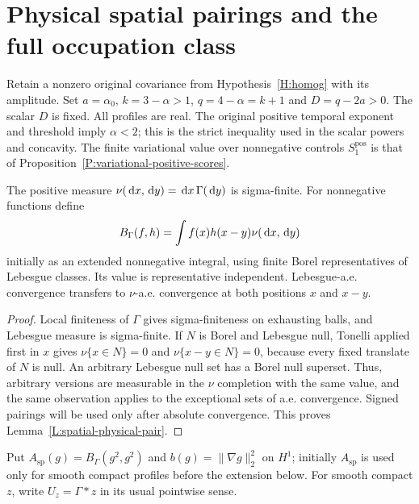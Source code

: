 \section{Physical spatial pairings and the full occupation class}
\label{S:spatial-occupation-foundation}

Retain a nonzero original covariance from Hypothesis~\ref{H:homog} with its
amplitude. Set $a = \alpha_0$, $k = 3-\alpha > 1$, $q = 4-\alpha = k+1$ and $D =
q-2a > 0$. The scalar $D$ is fixed. All profiles are real. The original positive
temporal exponent and threshold imply $\alpha < 2$; this is the strict
inequality used in the scalar powers and concavity. The finite variational value
over nonnegative controls $S_1^{\mathrm{pos}}$ is that of
Proposition~\ref{P:variational-positive-scores}.

\begin{lemma}\label{L:spatial-physical-pair}
  The positive measure $\nu(\,\mathrm{d} x,\,\mathrm{d} y) = \,\mathrm{d} x\,\Gamma(\,\mathrm{d} y)$ is
  sigma-finite. For nonnegative functions define
  \begin{equation}\label{E:spatial-physical-pair}
    B_\Gamma(f,h)=\int f(x)h(x-y)\nu(\,\mathrm{d} x,\,\mathrm{d} y)
  \end{equation}
  initially as an extended nonnegative integral, using finite Borel
  representatives of Lebesgue classes. Its value is representative independent.
  Lebesgue-a.e. convergence transfers to $\nu$-a.e. convergence at both
  positions $x$ and $x-y$.
\end{lemma}

\begin{proof}
  Local finiteness of $\Gamma$ gives sigma-finiteness on exhausting balls, and
  Lebesgue measure is sigma-finite. If $N$ is Borel and Lebesgue null, Tonelli
  applied first in $x$ gives $\nu\{x\in N\} = 0$ and $\nu\{x-y\in N\} = 0$,
  because every fixed translate of $N$ is null. An arbitrary Lebesgue null set
  has a Borel null superset. Thus, arbitrary versions are measurable in the
  $\nu$ completion with the same value, and the same observation applies to the
  exceptional sets of a.e. convergence. Signed pairings will be used only after
  absolute convergence. This proves Lemma~\ref{L:spatial-physical-pair}.
\end{proof}

Put $A_{\mathrm{sp}}(g) = B_\Gamma(g^2,g^2)$ and $b(g) = \|\nabla g\|_2^2$ on
$H^1$; initially $A_{\mathrm{sp}}$ is used only for smooth compact profiles
before the extension below. For smooth compact $z$, write $U_z = \Gamma*z$ in
its usual pointwise sense.

